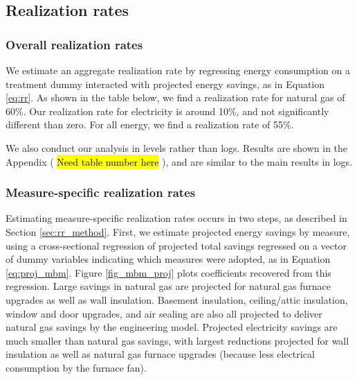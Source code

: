 \documentclass{article}
\newcommand{\hlc}[2][yellow]{ {\sethlcolor{#1} \hl{#2}} }
\begin{document}
\subsection{Realization rates}



\subsubsection{Overall realization rates}
We estimate an aggregate realization rate by regressing energy consumption on a treatment dummy interacted with projected energy savings, as in Equation \ref{eq:rr}. As shown in the table below, we find a realization rate for natural gas of 60\%. Our realization rate for electricity is around 10\%, and not significantly different than zero. For all energy, we find a realization rate of 55\%. 



We also conduct our analysis in levels rather than logs. Results are shown in the Appendix (\hlc{Need table number here}), and are similar to the main results in logs.



\subsubsection{Measure-specific realization rates}
Estimating measure-specific realization rates occurs in two steps, as described in Section \ref{sec:rr_method}. First, we estimate projected energy savings by measure, using a cross-sectional regression of projected total savings regressed on a vector of dummy variables indicating which measures were adopted, as in Equation \eqref{eq:proj_mbm}. Figure \ref{fig_mbm_proj} plots coefficients recovered from this regression. Large savings in natural gas are projected for natural gas furnace upgrades as well as wall insulation. Basement insulation, ceiling/attic insulation, window and door upgrades, and air sealing are also all projected to deliver natural gas savings by the engineering model. Projected electricity savings are much smaller than natural gas savings, with largest reductions projected for wall insulation as well as natural gas furnace upgrades (because less electrical consumption by the furnace fan).
\end{document}
